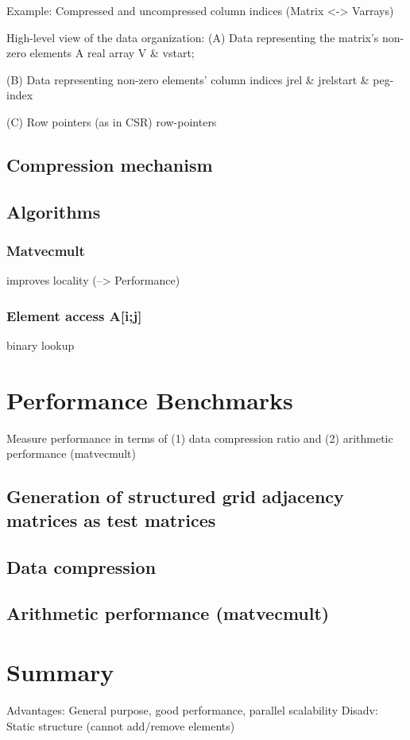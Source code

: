 \documentclass{article}
\begin{document}
      Example: Compressed and uncompressed column indices (Matrix <-> Varrays)

    High-level view of the data organization:
    (A) Data representing the matrix's non-zero elements
      A real array V & vstart;

    (B) Data representing non-zero elements' column indices
      jrel & jrelstart & peg-index

    (C) Row pointers (as in CSR) row-pointers

  \subsection{Compression mechanism}

  \subsection{Algorithms}

    \subsubsection{Matvecmult}
      improves locality (--> Performance)

    \subsubsection{Element access A[i;j]}
      binary lookup

\section{Performance Benchmarks}
  Measure performance in terms of (1) data compression ratio and (2) arithmetic performance (matvecmult)

  \subsection{Generation of structured grid adjacency matrices as test matrices}

  \subsection{Data compression}

  \subsection{Arithmetic performance (matvecmult)}

\section{Summary}
  Advantages: General purpose, good performance, parallel scalability
  Disadv: Static structure (cannot add/remove elements)
\end{document}
